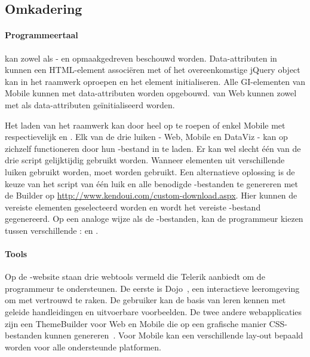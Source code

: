 \subsection{Omkadering}
\label{sec:kendo-omkadering}

\paragraph{Programmeertaal}
\kendo{} kan zowel als \js{}- en opmaakgedreven beschouwd worden. 
Data-attributen in kunnen een HTML-element associëren met \kendo{} of het overeenkomstige jQuery object kan in \js{} het raamwerk oproepen en het element initialiseren.
Alle GI-elementen van \kendo{} Mobile kunnen met data-attributen worden opgebouwd.
 van \kendo{} Web kunnen zowel met \js{} als data-attributen geïnitialiseerd worden.

Het laden van het raamwerk kan door heel \kendo{} op te roepen of enkel \kendo{} Mobile met respectievelijk  en .
Elk van de drie luiken - Web, Mobile en DataViz - kan op zichzelf functioneren door hun \js{}-bestand in te laden.
Er kan wel slecht één van de drie script gelijktijdig gebruikt worden.  
Wanneer elementen uit verschillende luiken gebruikt worden, moet  worden gebruikt.
Een alternatieve oplossing is de keuze van het script van één luik en alle benodigde \js{}-bestanden te genereren met de \js{} Builder op \url{http://www.kendoui.com/custom-download.aspx}.
Hier kunnen de vereiste elementen geselecteerd worden en wordt het vereiste \js{}-bestand gegenereerd.
Op een analoge wijze als de \js{}-bestanden, kan de programmeur kiezen tussen verschillende :   en .

\paragraph{Tools}
Op de \kendo{}-website staan drie webtools vermeld die Telerik aanbiedt om de programmeur te ondersteunen.
De eerste is \kendo{} Dojo~\cite{Telerika},  een interactieve leeromgeving om met \kendo{} vertrouwd te raken.
De gebruiker kan de basis van \kendo{} leren kennen met geleide handleidingen en uitvoerbare voorbeelden.
De twee andere webapplicaties zijn een ThemeBuilder voor Web en Mobile die op een grafische manier CSS-bestanden kunnen genereren~\cite{Telerikb,Telerikc}.
Voor \kendo{} Mobile kan een verschillende lay-out bepaald worden voor alle ondersteunde platformen.


